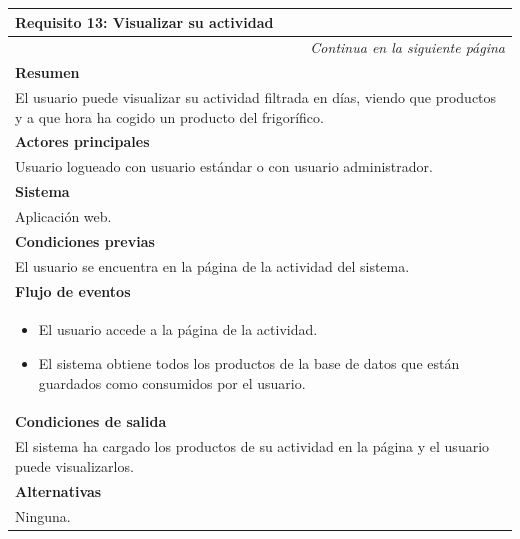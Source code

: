 \begin{longtable}{|p{}|}
\hline
 \rowcolor[gray]{.5}
 \color{white}\textbf{Requisito 13: Visualizar su actividad} \\
\hline
\endfirsthead
\endhead
\hline \multicolumn{1}{r}{\textit{Continua en la siguiente página}} \\
\endfoot
\endlastfoot
    \rowcolor[gray]{.9}
     \textbf{Resumen} \\
     \hline
     El usuario puede visualizar su actividad filtrada en días, viendo que productos y a que hora ha cogido un producto del frigorífico. \\
     \hline
     \rowcolor[gray]{.9}
     \textbf{Actores principales} \\
     \hline
     Usuario logueado con usuario estándar o con usuario administrador. \\
     \hline
     \rowcolor[gray]{.9}
     \textbf{Sistema} \\
     \hline
     Aplicación web. \\
     \hline
     \rowcolor[gray]{.9}
     \textbf{Condiciones previas} \\
     \hline
     El usuario se encuentra en la página de la actividad del sistema. \\
     \hline
     \rowcolor[gray]{.9}
     \textbf{Flujo de eventos}  \\
     \hline
      \begin{itemize}
         \item El usuario accede a la página de la actividad.
         \item El sistema obtiene todos los productos de la base de datos que están guardados como consumidos por el usuario.
     \end{itemize} \\
     \hline
     \rowcolor[gray]{.9}
     \textbf{Condiciones de salida} \\
     \hline
     El sistema ha cargado los productos de su actividad en la página y el usuario puede visualizarlos. \\
     \hline
     \rowcolor[gray]{.9}
     \textbf{Alternativas}  \\
     \hline
      Ninguna.\\
     \hline
\end{longtable}

